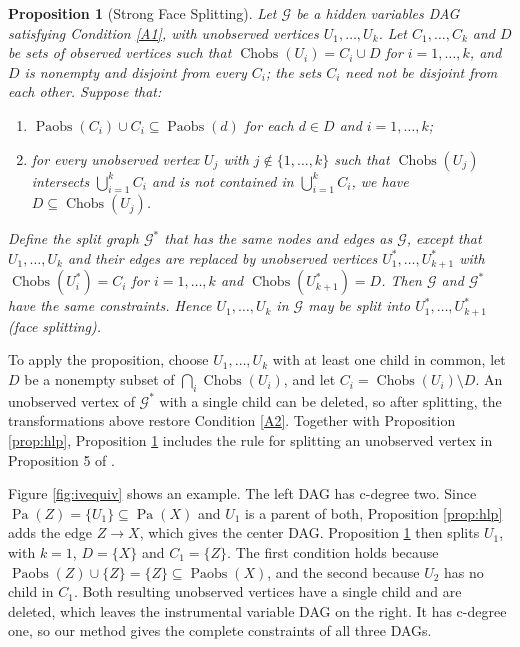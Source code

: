 \documentclass[12pt]{article}
\newtheorem{proposition}{Proposition}
\DeclareMathOperator{\Paobs}{Paobs}
\DeclareMathOperator{\Chobs}{Chobs}
\DeclareMathOperator{\Pa}{Pa}
\begin{document}
\begin{proposition}[Strong Face Splitting] \label{prop:strong}
  Let $\mathcal{G}$ be a hidden variables DAG satisfying Condition \ref{A1}, with unobserved vertices $U_1, \ldots, U_k$. Let $C_1, \ldots, C_k$ and $D$ be sets of observed vertices such that $\Chobs(U_i) = C_i \cup D$ for $i = 1, \ldots, k$, and $D$ is nonempty and disjoint from every $C_i$; the sets $C_i$ need not be disjoint from each other. Suppose that:
  \begin{enumerate}
      \item $\Paobs(C_i) \cup C_i \subseteq \Paobs(d)$ for each $d \in D$ and $i = 1, \dots, k$;
      \item for every unobserved vertex $U_j$ with $j \notin \{1, \ldots, k\}$ such that $\Chobs(U_j)$ intersects $\bigcup_{i=1}^k C_i$ and is not contained in $\bigcup_{i=1}^k C_i$, we have $D \subseteq \Chobs(U_j)$.
  \end{enumerate}
  Define the \emph{split} graph $\mathcal{G}^*$ that has the same nodes and edges as $\mathcal{G}$, except that $U_1, \ldots, U_k$ and their edges are replaced by unobserved vertices $U^*_1, \ldots, U^*_{k+1}$ with $\Chobs(U^*_i) = C_i$ for $i = 1, \ldots, k$ and $\Chobs(U^*_{k+1}) = D$. Then $\mathcal{G}$ and $\mathcal{G}^*$ have the same constraints. Hence $U_1, \ldots, U_k$ in $\mathcal{G}$ may be split into $U^*_1, \ldots, U^*_{k+1}$ (face splitting).
\end{proposition}

To apply the proposition, choose $U_1, \ldots, U_k$ with at least one child in common, let $D$ be a nonempty subset of $\bigcap_i \Chobs(U_i)$, and let $C_i = \Chobs(U_i) \setminus D$. An unobserved vertex of $\mathcal{G}^*$ with a single child can be deleted, so after splitting, the transformations above restore Condition \ref{A2}. Together with Proposition \ref{prop:hlp}, Proposition \ref{prop:strong} includes the rule for splitting an unobserved vertex in Proposition 5 of \citet{evans2016graphs}.

Figure \ref{fig:ivequiv} shows an example. The left DAG has c-degree two. Since $\Pa(Z) = \{U_1\} \subseteq \Pa(X)$ and $U_1$ is a parent of both, Proposition \ref{prop:hlp} adds the edge $Z \rightarrow X$, which gives the center DAG. Proposition \ref{prop:strong} then splits $U_1$, with $k = 1$, $D = \{X\}$ and $C_1 = \{Z\}$. The first condition holds because $\Paobs(Z) \cup \{Z\} = \{Z\} \subseteq \Paobs(X)$, and the second because $U_2$ has no child in $C_1$. Both resulting unobserved vertices have a single child and are deleted, which leaves the instrumental variable DAG on the right. It has c-degree one, so our method gives the complete constraints of all three DAGs.
\end{document}
